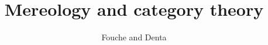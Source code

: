 \documentclass{amsart}
\author{Fouche and Denta}
\title{Mereology and category theory}
\begin{document}
\section{}
\end{document}
